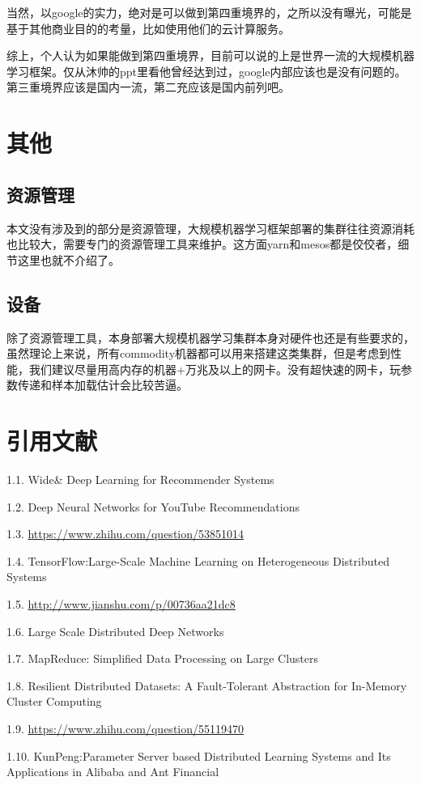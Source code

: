 \documentclass[12pt]{article}
\begin{document}
当然，以google的实力，绝对是可以做到第四重境界的，之所以没有曝光，可能是基于其他商业目的的考量，比如使用他们的云计算服务。

综上，个人认为如果能做到第四重境界，目前可以说的上是世界一流的大规模机器学习框架。仅从沐帅的ppt里看他曾经达到过，google内部应该也是没有问题的。第三重境界应该是国内一流，第二充应该是国内前列吧。

\section{其他}
\subsection{资源管理}
本文没有涉及到的部分是资源管理，大规模机器学习框架部署的集群往往资源消耗也比较大，需要专门的资源管理工具来维护。这方面yarn和mesos都是佼佼者，细节这里也就不介绍了。

\subsection{设备}
除了资源管理工具，本身部署大规模机器学习集群本身对硬件也还是有些要求的，虽然理论上来说，所有commodity机器都可以用来搭建这类集群，但是考虑到性能，我们建议尽量用高内存的机器+万兆及以上的网卡。没有超快速的网卡，玩参数传递和样本加载估计会比较苦逼。

\section{引用文献}
1.1. Wide\& Deep Learning for Recommender Systems

1.2. Deep Neural Networks for YouTube Recommendations

1.3. \url{https://www.zhihu.com/question/53851014}

1.4. TensorFlow:Large-Scale Machine Learning on Heterogeneous Distributed Systems

1.5. \url{http://www.jianshu.com/p/00736aa21dc8}

1.6. Large Scale Distributed Deep Networks

1.7. MapReduce: Simplified Data Processing on Large
Clusters

1.8. Resilient Distributed Datasets: A Fault-Tolerant Abstraction for In-Memory Cluster Computing

1.9. \url{https://www.zhihu.com/question/55119470}

1.10. KunPeng:Parameter Server based Distributed Learning Systems and Its Applications in
Alibaba and Ant Financial
\end{document}
